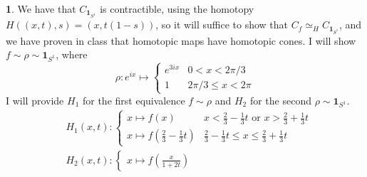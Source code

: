 \documentclass[10.5pt]{article}
\theoremstyle{definition}
\newtheorem{pb}{}
\newcommand{\tor}{\text{ or }}
\newcommand{\ism}{\simeq}
\begin{document}
\begin{pb}
        We have that \(C_{\mathbf{1}_{S^1}}\) is contractible, using the homotopy \(H((x,t),s) = (x,t(1-s))\), so it will suffice to show that \(C_{f} \ism_H C_{\mathbf{1}_{S^1}}\), and we 
        have proven in class that homotopic maps have homotopic cones. I will show \(f \sim \rho \sim \mathbf{1}_{S^1}\), where \[\rho: e^{ix} \mapsto 
        \begin{cases} 
        e^{3ix} & 0 < x < 2\pi/3 \\ 
        1 & 2\pi/3 \leq x < 2\pi
        \end{cases}\]
        I will provide \(H_1\) for the first equivalence \(f \sim \rho\) and \(H_2\) for the second \(\rho \sim \mathbf{1}_{S^1}\).
        \begin{align*}
            &H_1(x,t):
            \begin{cases}
                x \mapsto f(x) & x < \frac{2}{3} - \frac{1}{3}t \tor x > \frac{2}{3} + \frac{1}{3}t \\ 
                x \mapsto f(\frac{2}{3} - \frac{1}{3}t) & \frac{2}{3} - \frac{1}{3}t \leq x \leq \frac{2}{3} + \frac{1}{3}t
            \end{cases} \\
            &H_2(x,t):
            \begin{cases}
                x \mapsto f(\frac{x}{1 + 2t})
            \end{cases}
        \end{align*}
    \end{pb}
\end{document}
